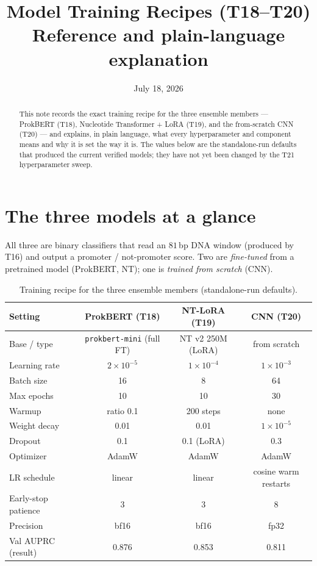 \documentclass{article}
\title{Model Training Recipes (T18--T20)\\ \large Reference and plain-language explanation}
\date{July 18, 2026}
\author{}
\begin{document}
\maketitle

\begin{abstract}
This note records the exact training recipe for the three ensemble members --- ProkBERT (T18), Nucleotide Transformer + LoRA (T19), and the from-scratch CNN (T20) --- and explains, in plain language, what every hyperparameter and component means and why it is set the way it is. The values below are the standalone-run defaults that produced the current verified models; they have not yet been changed by the T21 hyperparameter sweep.
\end{abstract}

\section{The three models at a glance}
All three are binary classifiers that read an $81$\,bp DNA window (produced by T16) and output a promoter / not-promoter score. Two are \emph{fine-tuned} from a pretrained model (ProkBERT, NT); one is \emph{trained from scratch} (CNN).

\begin{table}[h]
\centering
\caption{Training recipe for the three ensemble members (standalone-run defaults).}
\begin{tabular}{lccc}
\toprule
Setting & ProkBERT (T18) & NT-LoRA (T19) & CNN (T20) \\
\midrule
Base / type        & \texttt{prokbert-mini} (full FT) & NT v2 250M (LoRA) & from scratch \\
Learning rate      & $2\times10^{-5}$ & $1\times10^{-4}$ & $1\times10^{-3}$ \\
Batch size         & 16 & 8 & 64 \\
Max epochs         & 10 & 10 & 30 \\
Warmup             & ratio 0.1 & 200 steps & none \\
Weight decay       & 0.01 & 0.01 & $1\times10^{-5}$ \\
Dropout            & 0.1 & 0.1 (LoRA) & 0.3 \\
Optimizer          & AdamW & AdamW & AdamW \\
LR schedule        & linear & linear & cosine warm restarts \\
Early-stop patience& 3 & 3 & 8 \\
Precision          & bf16 & bf16 & fp32 \\
\midrule
Val AUPRC (result) & 0.876 & 0.853 & 0.811 \\
\bottomrule
\end{tabular}
\end{table}
\end{document}
